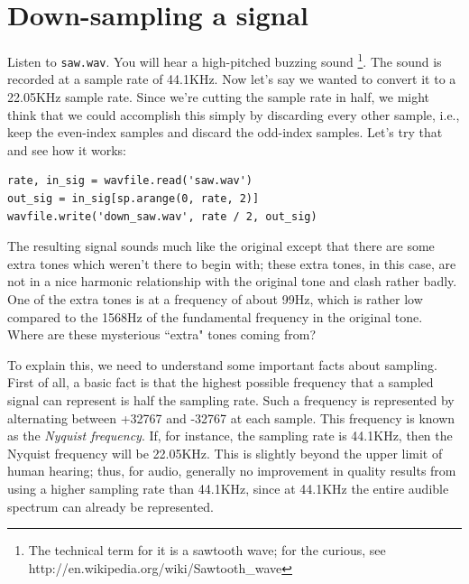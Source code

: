 \section*{Down-sampling a signal}

Listen to \texttt{saw.wav}.
You will hear a high-pitched buzzing sound \footnote{The technical term for it is a sawtooth wave; for the curious, see http://en.wikipedia.org/wiki/Sawtooth\_wave}.
The sound is recorded at a sample rate of 44.1KHz.
Now let's say we wanted to convert it to a 22.05KHz sample rate.
Since we're cutting the sample rate in half, we might think that we could accomplish this simply by discarding every other sample, i.e., keep the even-index samples and discard the odd-index samples.
Let's try that and see how it works:
\begin{lstlisting}
rate, in_sig = wavfile.read('saw.wav')
out_sig = in_sig[sp.arange(0, rate, 2)]
wavfile.write('down_saw.wav', rate / 2, out_sig)
\end{lstlisting}
The resulting signal sounds much like the original except that there are some extra tones which weren't there to begin with; these extra tones, in this case, are not in a nice harmonic relationship with the original tone and clash rather badly.
One of the extra tones is at a frequency of about 99Hz, which is rather low compared to the 1568Hz of the fundamental frequency in the original tone.
Where are these mysterious ``extra" tones coming from?

To explain this, we need to understand some important facts about sampling.
First of all, a basic fact is that the highest possible frequency that a sampled signal can represent is half the sampling rate.
Such a frequency is represented by alternating between +32767 and -32767 at each sample.
This frequency is known as the \emph{Nyquist frequency}.
If, for instance, the sampling rate is 44.1KHz, then the Nyquist frequency will be 22.05KHz.
This is slightly beyond the upper limit of human hearing; thus, for audio, generally no improvement in quality results from using a higher sampling rate than 44.1KHz, since at 44.1KHz the entire audible spectrum can already be represented.

